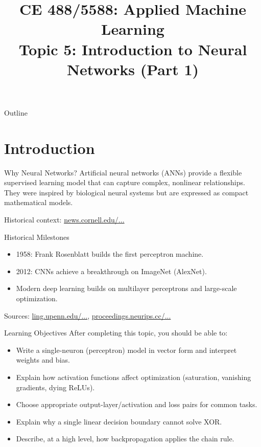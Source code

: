 \documentclass[10pt]{beamer}
\title[Topic 5 Part 1]{CE 488/5588: Applied Machine Learning\\\large Topic 5: Introduction to Neural Networks (Part 1)}
\author{}
\date{}
\begin{document}
\begin{frame}[plain]
  \titlepage
\end{frame}

\begin{frame}{Outline}
  \justifying
  \tableofcontents
\end{frame}

\section{Introduction}

\begin{frame}{Why Neural Networks?}
  \justifying
  Artificial neural networks (ANNs) provide a flexible supervised learning model that can capture complex, nonlinear relationships.
  They were inspired by biological neural systems but are expressed as compact mathematical models.

  \vspace{0.5em}
  \footnotesize
  Historical context: \href{https://news.cornell.edu/stories/2019/09/professors-perceptron-paved-way-ai-60-years-too-soon}{news.cornell.edu/...}
\end{frame}

\begin{frame}{Historical Milestones}
  \justifying
  \begin{itemize}
    \item 1958: Frank Rosenblatt builds the first perceptron machine.
    \item 2012: CNNs achieve a breakthrough on ImageNet (AlexNet).
    \item Modern deep learning builds on multilayer perceptrons and large-scale optimization.
  \end{itemize}
  \vspace{0.5em}
  \footnotesize
  Sources: \href{https://www.ling.upenn.edu/courses/cogs501/Rosenblatt1958.pdf}{ling.upenn.edu/...},
  \href{https://proceedings.neurips.cc/paper/4824-imagenet-classification-with-deep-convolutional-neural-networks.pdf}{proceedings.neurips.cc/...}
\end{frame}

\begin{frame}{Learning Objectives}
  \justifying
  After completing this topic, you should be able to:
  \begin{itemize}
    \item Write a single-neuron (perceptron) model in vector form and interpret weights and bias.
    \item Explain how activation functions affect optimization (saturation, vanishing gradients, dying ReLUs).
    \item Choose appropriate output-layer/activation and loss pairs for common tasks.
    \item Explain why a single linear decision boundary cannot solve XOR.
    \item Describe, at a high level, how backpropagation applies the chain rule.
  \end{itemize}
\end{frame}
\end{document}
